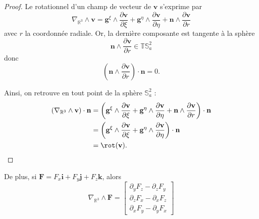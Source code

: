 \begin{proof}
Le rotationnel d'un champ de vecteur de $\mathbf{v}$ s'exprime par
\begin{equation}
\nabla_{\mathbb{R}^3} \wedge \mathbf{v} = \mathbf{g}^{\xi} \wedge \dfrac{\partial \mathbf{v}}{\partial \xi} + \mathbf{g}^{\eta} \wedge \dfrac{\partial \mathbf{v}}{\partial \eta} + \mathbf{n}\wedge \dfrac{\partial \mathbf{v}}{\partial r}
\end{equation}
avec $r$ la coordonnée radiale. 
Or, la dernière composante est tangente à la sphère
\begin{equation}
\mathbf{n}\wedge \dfrac{\partial \mathbf{v}}{\partial r} \in \mathbb{T}\mathbb{S}_a^2
\end{equation}
donc
\begin{equation}
\left(  \mathbf{n}\wedge \dfrac{\partial \mathbf{v}}{\partial r} \right) \cdot \mathbf{n} = 0.
\end{equation}

Ainsi, on retrouve en tout point de la sphère $\mathbb{S}_a^2$ :
\begin{align}
\left(  \nabla_{\mathbb{R}^3} \wedge \mathbf{v} \right) \cdot \mathbf{n} & = \left(  \mathbf{g}^{\xi} \wedge \dfrac{\partial \mathbf{v}}{\partial \xi} + \mathbf{g}^{\eta} \wedge \dfrac{\partial \mathbf{v}}{\partial \eta} + \mathbf{n}\wedge \dfrac{\partial \mathbf{v}}{\partial r} \right) \cdot \mathbf{n} \\
& = \left(  \mathbf{g}^{\xi} \wedge \dfrac{\partial \mathbf{v}}{\partial \xi} + \mathbf{g}^{\eta} \wedge \dfrac{\partial \mathbf{v}}{\partial \eta} \right) \cdot \mathbf{n} \\
& = \rot ( \mathbf{v} ).
\end{align}
\end{proof}

De plus, si $\mathbf{F} = F_x \mathbf{i} + F_y \mathbf{j} + F_z  \mathbf{k}$, alors
\begin{equation}
\nabla_{\mathbb{R}^3} \wedge \mathbf{F} =
\begin{bmatrix}
\partial_y F_z - \partial_z F_y \\
\partial_z F_x - \partial_x F_z \\
\partial_x F_y - \partial_y F_x
\end{bmatrix} 
\end{equation}

